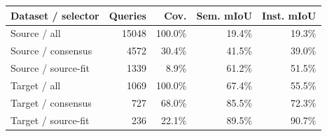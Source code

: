 \begin{tabular}{lrrrr}
\toprule
Dataset / selector & Queries & Cov. & Sem. mIoU & Inst. mIoU \\
\midrule
Source / all & 15048 & 100.0\% & 19.4\% & 19.3\% \\
Source / consensus & 4572 & 30.4\% & 41.5\% & 39.0\% \\
Source / source-fit & 1339 & 8.9\% & 61.2\% & 51.5\% \\
Target / all & 1069 & 100.0\% & 67.4\% & 55.5\% \\
Target / consensus & 727 & 68.0\% & 85.5\% & 72.3\% \\
Target / source-fit & 236 & 22.1\% & 89.5\% & 90.7\% \\
\bottomrule
\end{tabular}
